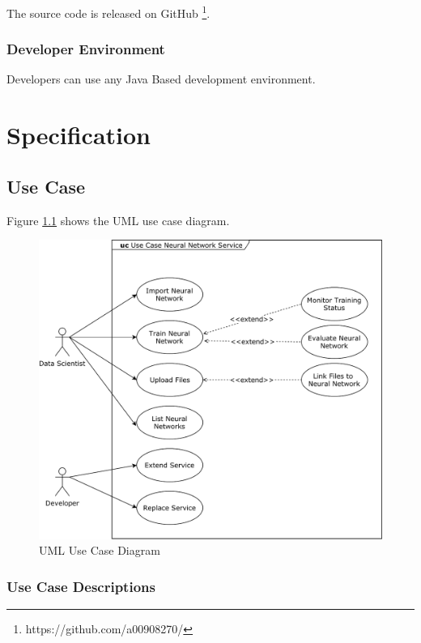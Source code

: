 The source code is released on GitHub \footnote{https://github.com/a00908270/}.

\subsection{Developer Environment}\label{developer-environment}

Developers can use any Java Based development environment.

\chapter{Specification}\label{specification}

\section{Use Case}\label{use-case}

Figure \ref{img.use_case_nn} shows the UML use case diagram.

\begin{figure}
\centering
\includegraphics[width=15.00000cm]{images/use_case_nn}
\caption{UML Use Case Diagram \label{img.use_case_nn}}
\end{figure}

\subsection{Use Case Descriptions}\label{use-case-descriptions}

